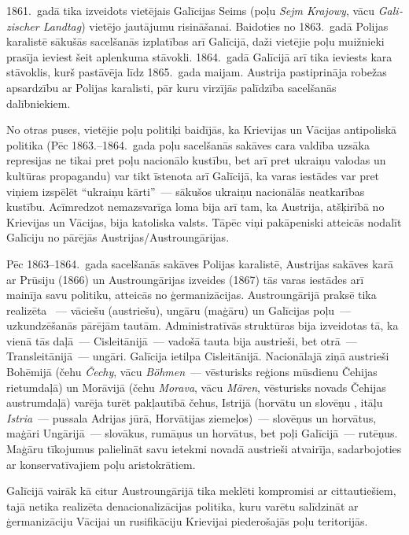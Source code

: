 \documentclass[twoside,a5paper,12pt,fleqn,openany]{extbook}
\newcommand{\pltxti}[1]{\textit{\textpolish{#1}}}
\newcommand{\detxti}[1]{\textit{\textgerman{#1}}}
\newcommand{\ittxti}[1]{\textit{\textitalian{#1}}}
\newcommand{\cstxti}[1]{\textit{\textczech{#1}}}
\newcommand{\sltxti}[1]{\textit{\textslovene{#1}}}
\begin{document}
1861.~gadā tika izveidots vietējais Galīcijas Seims (poļu \pltxti{Sejm Krajowy}, vācu \detxti{Galizischer Landtag}) vietējo jautājumu risināšanai. Baidoties no 1863.~gadā Polijas karalistē sākušās sacelšanās izplatības arī Galīcijā, daži vietējie poļu muižnieki prasīja ieviest šeit aplenkuma stāvokli. 1864.~gadā Galīcijā arī tika ieviests kara stāvoklis, kurš pastāvēja līdz 1865.~gada maijam. Austrija pastiprināja robežas apsardzību ar Polijas karalisti, pār kuru virzījās palīdzība sacelšanās dalībniekiem.

No otras puses, vietējie poļu politiķi baidījās, ka Krievijas un Vācijas antipoliskā politika (Pēc 1863.--1864.~gada poļu sacelšanās sakāves cara valdība uzsāka represijas ne tikai pret poļu nacionālo kustību, bet arī pret ukraiņu valodas un kultūras propagandu) var tikt īstenota arī Galīcijā, ka varas iestādes var pret viņiem izspēlēt ``ukraiņu kārti''~--- sākušos ukraiņu nacionālās neatkarības kustību. Acīmredzot nemazsvarīga loma bija arī tam, ka Austrija, atšķirībā no Krievijas un Vācijas, bija katoliska valsts. Tāpēc viņi pakāpeniski atteicās nodalīt Galīciju no pārējās Austrijas/Austroungārijas.

Pēc 1863--1864.~gada sacelšanās sakāves Polijas karalistē, Austrijas sakāves karā ar Prūsiju (1866) un Austroungārijas izveides (1867) tās varas iestādes arī mainīja savu politiku, atteicās no ģermanizācijas. Austroungārijā praksē tika realizēta ~--- vāciešu (austriešu), ungāru (maģāru) un Galīcijas poļu~--- uzkundzēšanās pārējām tautām. Administratīvās struktūras bija izveidotas tā, ka vienā tās daļā~--- Cisleitānijā~--- vadošā tauta bija austrieši, bet otrā~--- Transleitānijā~--- ungāri. Galīcija ietilpa Cisleitānijā. Nacionālajā ziņā austrieši Bohēmijā (čehu \cstxti{Čechy}, vācu \detxti{Böhmen}~--- vēsturisks reģions mūsdienu Čehijas rietumdaļā) un Morāvijā (čehu \cstxti{Morava}, vācu \detxti{Mären}, vēsturisks novads Čehijas austrumdaļā) varēja turēt pakļautībā čehus, Istrijā (horvātu un slovēņu \sltxti{Istra}, itāļu \ittxti{Istria}~--- pussala Adrijas jūrā, Horvātijas ziemeļos)~--- slovēņus un horvātus, maģāri Ungārijā~--- slovākus, rumāņus un horvātus, bet poļi Galīcijā~--- rutēņus. Maģāru tīkojumus palielināt savu ietekmi novadā austrieši atvairīja, sadarbojoties ar konservatīvajiem poļu aristokrātiem.

Galīcijā vairāk kā citur Austroungārijā tika meklēti kompromisi ar cittautiešiem, tajā netika realizēta denacionalizācijas politika, kuru varētu salīdzināt ar ģermanizāciju Vācijai un rusifikāciju Krievijai piederošajās poļu teritorijās.
\end{document}
